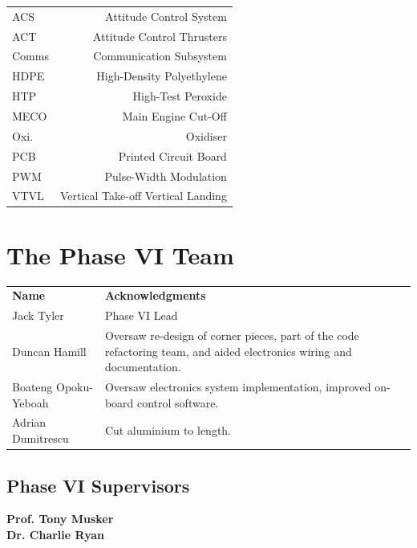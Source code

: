 \documentclass[12pt]{article}
\begin{document}
\begin{tabular}{l r}
ACS & Attitude Control System \\
ACT & Attitude Control Thrusters \\
Comms & Communication Subsystem \\
HDPE & High-Density Polyethylene \\
HTP & High-Test Peroxide \\
MECO & Main Engine Cut-Off \\
Oxi. & Oxidiser \\
PCB & Printed Circuit Board \\
PWM & Pulse-Width Modulation \\
VTVL & Vertical Take-off Vertical Landing \\
\end{tabular}

    \cleardoublepage


\section*{The Phase VI Team}

\begin{centering}
\begin{tabular}{p{.4\linewidth} p{.4\linewidth}}
\textbf{Name} & \textbf{Acknowledgments} \\
Jack Tyler & Phase VI Lead  \\

Duncan Hamill & Oversaw re-design of corner pieces, part of the code refactoring team, and aided electronics wiring and documentation. \\

Boateng Opoku-Yeboah & Oversaw electronics system implementation, improved on-board control software.\\

Adrian Dumitrescu & Cut aluminium to length.\\

\end{tabular}
\end{centering}

\subsection*{Phase VI Supervisors}

\begin{center}
\textbf{Prof. Tony Musker}\\
\textbf{Dr. Charlie Ryan}
\end{center}
\end{document}
